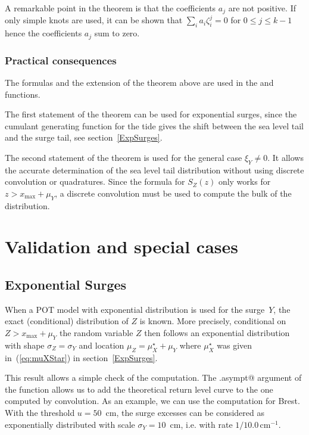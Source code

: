 \documentclass[11pt,a4paper]{report}\usepackage[]{graphicx}\usepackage[]{color}
\newcommand{\Up}[1]{#1_{\mathrm{max}}}
\begin{document}
A remarkable point in the theorem is that the coefficients $a_j$ are 
not positive. If only simple knots are used, it can be shown that
$\sum_i a_i \zeta_i^j = 0$ for $0 \leqslant j \leqslant k-1$ hence
the coefficients $a_j$ sum to zero.

\subsection{Practical consequences}
The formulas and the extension of the theorem above are used in the
\verb@GPDtail@ and \verb@momGen@ functions.

The first statement of the theorem can be used for exponential 
surges, since the cumulant generating function for the tide gives the 
shift between the sea level tail and the surge tail, see section~\ref{ExpSurges}.

The second statement of the theorem is used for the general case $\xi_Y \neq 0$. It
allows the accurate determination of the sea level tail distribution  
without using discrete convolution or quadratures. Since the formula
for $S_Z(z)$ only works for $z > \Up{x} + \mu_Y$, a discrete 
convolution must be used to compute the bulk of the distribution.






\chapter{Validation and special cases}
\section{Exponential Surges}
\label{AnnExpSurges}
 When a POT model with exponential
distribution is used for the surge~$Y$, the exact (conditional)
distribution of $Z$ is known. More precisely, conditional on $Z >
x_{\mathrm{max}} + \mu_Y$ the random variable $Z$ then follows an
exponential distribution with shape $\sigma_Z=\sigma_Y$ and location
$\mu_Z = \mu_X^\star + \mu_Y$ where $\mu_X^\star$ was given
in~(\ref{eq:muXStar}) in section~\ref{ExpSurges}.

This result allows a simple check of the computation. The \verb@show.asympt@
argument of the \verb@convSL@ function allows us to add the theoretical
return level curve to the one computed by convolution. As an example, we can
use the computation for Brest. With the threshold $u=50$~cm, the surge
excesses can be considered as exponentially 
distributed with scale $\sigma_Y=10$~cm, i.e. with rate $1/10.0\,\mathrm{cm}^{-1}$.
\end{document}
